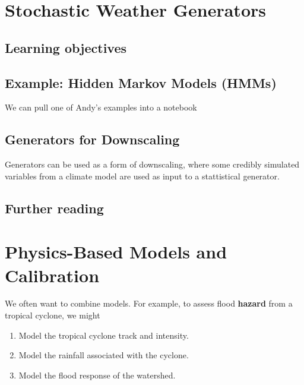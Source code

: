 \documentclass[
  letterpaper,
  DIV=11,
  numbers=noendperiod]{scrreprt}
\providecommand{\tightlist}{%
  \setlength{\itemsep}{0pt}\setlength{\parskip}{0pt}}
\begin{document}
\chapter{Stochastic Weather Generators
🚧}\label{stochastic-weather-generators}

\section*{Learning objectives}\label{learning-objectives-9}


\section{Example: Hidden Markov Models
(HMMs)}\label{example-hidden-markov-models-hmms}

We can pull one of Andy's examples into a notebook

\section{Generators for Downscaling}\label{generators-for-downscaling}

Generators can be used as a form of downscaling, where some credibly
simulated variables from a climate model are used as input to a
stattistical generator.

\section*{Further reading}\label{further-reading-9}


\chapter{Physics-Based Models and Calibration
🚧}\label{physics-based-models-and-calibration}

We often want to combine models. For example, to assess flood
\textbf{hazard} from a tropical cyclone, we might

\begin{enumerate}
\def\labelenumi{\arabic{enumi}.}
\tightlist
\item
  Model the tropical cyclone track and intensity.
\item
  Model the rainfall associated with the cyclone.
\item
  Model the flood response of the watershed.
\end{enumerate}
\end{document}
